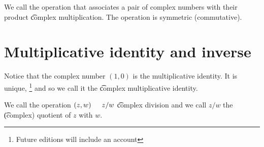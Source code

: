 We call the operation that associates a pair of complex numbers with their product \t{complex multiplication}.
The operation is symmetric (commutative).

\section*{Multiplicative identity and inverse}

Notice that the complex number $(1, 0)$ is the multiplicative identity.
It is unique,
  \ifhmode\unskip\fi\footnote{
Future editions will include an account
  }
and so we call it the \t{complex multiplicative identity.}

We call the operation $(z, w) \indent z/w$ \t{complex division} and we call $z/w$ the \t{(complex) quotient} of $z$ with $w$.
